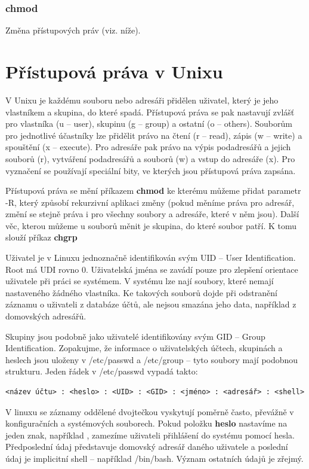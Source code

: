 \documentclass{article}
\begin{document}
\subsubsection{chmod}
Změna přístupových práv (viz. níže).

\section{Přístupová práva v Unixu}
V Unixu je každému souboru nebo adresáři přidělen uživatel, který je jeho vlastníkem a skupina, do které spadá. Přístupová práva se pak nastavují zvlášť pro vlastníka (u -- user), skupinu (g -- group) a ostatní (o -- others). Souborům pro jednotlivé účastníky lze přidělit právo na čtení (r -- read), zápis (w -- write) a spouštění (x -- execute). Pro adresáře pak právo na výpis podadresářů a jejich souborů (r), vytváření podadresářů a souborů (w) a vstup do adresáře (x). Pro vyznačení se používají speciální bity, ve kterých jsou přístupová práva zapsána. 

Přístupová práva se mění příkazem \textbf{chmod} ke kterému můžeme přidat parametr -R, který způsobí rekurzivní aplikaci změny (pokud měníme práva pro adresář, změní se stejně práva i pro všechny soubory a adresáře, které v něm jsou). Další věc, kterou můžeme u souborů měnit je skupina, do které soubor patří. K tomu slouží příkaz \textbf{chgrp}

Uživatel je v Linuxu jednoznačně identifikován svým UID -- User Identification. Root má UDI rovno 0. Uživatelská jména se zavádí pouze pro zlepšení orientace uživatele při práci se systémem. V systému lze nají soubory, které nemají nastaveného žádného vlastníka. Ke  takových souborů dojde při odstranění záznamu o uživateli z databáze účtů, ale nejsou smazána jeho data, například z domovských adresářů. 

Skupiny jsou podobně jako uživatelé identifikovány svým GID -- Group Identification. Zopakujme, že informace o uživatelských účtech, skupinách a heslech jsou uloženy v /etc/passwd a /etc/group -- tyto soubory mají podobnou strukturu. Jeden řádek v /etc/passwd vypadá takto:
\begin{verbatim}
<název účtu> : <heslo> : <UID> : <GID> : <jméno> : <adresář> : <shell> 
\end{verbatim}
V linuxu se záznamy oddělené dvojtečkou vyskytují poměrně často, převážně v konfiguračních a systémových souborech. Pokud položku \textbf{heslo} nastavíme na jeden znak, například \uv{*}, zamezíme uživateli přihlášení do systému pomocí hesla. Předposlední údaj představuje domovský adresář daného uživatele a poslední údaj je implicitní shell -- například /bin/bash. Význam ostatních údajů je zřejmý.
\end{document}
